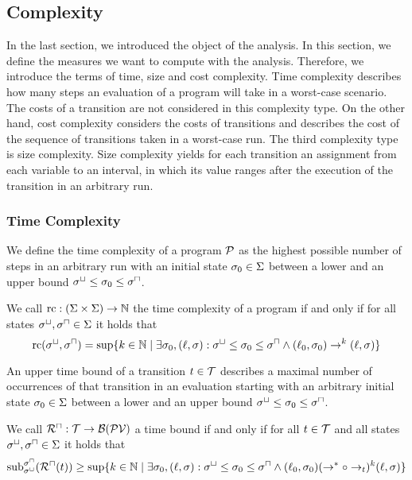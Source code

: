 \subsection{Complexity}

In the last section, we introduced the object of the analysis.
In this section, we define the measures we want to compute with the analysis.
Therefore, we introduce the terms of time, size and cost complexity.
Time complexity describes how many steps an evaluation of a program will take in a worst-case scenario.
The costs of a transition are not considered in this complexity type.
On the other hand, cost complexity considers the costs of transitions and describes the cost of the sequence of transitions taken in a worst-case run.
The third complexity type is size complexity.
Size complexity yields for each transition an assignment from each variable to an interval, in which its value ranges after the execution of the transition in an arbitrary run.

\subsubsection{Time Complexity}

We define the time complexity of a program $\mathcal{P}$ as the highest possible number of steps in an arbitrary run with an initial state $\sigma_0 \in \Sigma$ between a lower and an upper bound ${\sigma^\sqcup} \leq \sigma_0 \leq {\sigma^\sqcap}$.

\begin{definition}
  We call $\text{rc}: (\Sigma \times \Sigma) \rightarrow \mathbb{N}$ the time complexity of a program if and only if for all states ${\sigma^\sqcup}, {\sigma^\sqcap} \in \Sigma$ it holds that
  \[ \text{rc}({\sigma^\sqcup}, {\sigma^\sqcap}) = \sup \lbrace  k \in \mathbb{N} \mid \exists \sigma_0, (\ell, \sigma): {\sigma^\sqcup} \leq \sigma_0 \leq {\sigma^\sqcap} \wedge (\ell_0, \sigma_0) \rightarrow^k (\ell, \sigma)  \rbrace \]
\end{definition}

An upper time bound of a transition $t \in \mathcal{T}$ describes a maximal number of occurrences of that transition in an evaluation starting with an arbitrary initial state $\sigma_0 \in \Sigma$ between a lower and an upper bound $\sigma^\sqcup \leq \sigma_0 \leq \sigma^\sqcap$.

\begin{definition}
  We call ${\mathcal{R}^\sqcap}: \mathcal{T} \rightarrow \mathcal{B}(\mathcal{PV})$ a time bound if and only if for all $t \in \mathcal{T}$ and all states ${\sigma^\sqcup}, {\sigma^\sqcap} \in \Sigma$ it holds that
  \[ \text{sub}_{{\sigma^\sqcup}}^{{\sigma^\sqcap}}({\mathcal{R}^\sqcap}(t)) \geq \sup \lbrace  k \in \mathbb{N} \mid \exists \sigma_0, (\ell, \sigma): \sigma^\sqcup \leq \sigma_0 \leq \sigma^\sqcap \wedge (\ell_0, \sigma_0) (\rightarrow^* \circ \rightarrow_t)^k (\ell, \sigma)  \rbrace \]
\end{definition}


